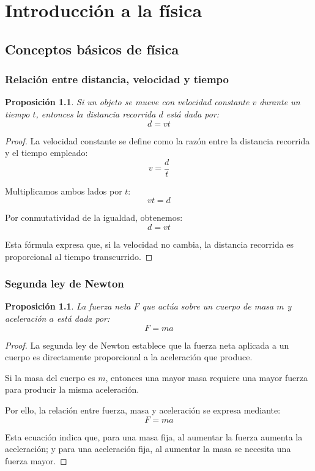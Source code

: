 \documentclass[12pt,final]{report}
\theoremstyle{plain}
\newtheorem{proposition}[theorem]{Proposición}
\theoremstyle{definition}
\begin{document}
\newpage

\chapter{Introducción a la física}

\section{Conceptos básicos de física}

\subsection{Relación entre distancia, velocidad y tiempo}

\begin{proposition}
Si un objeto se mueve con velocidad constante $v$ durante un tiempo $t$, entonces la distancia recorrida $d$ está dada por:
\[
d = vt
\]
\end{proposition}

\begin{proof}

La velocidad constante se define como la razón entre la distancia recorrida y el tiempo empleado:
\[
v = \frac{d}{t}
\]

Multiplicamos ambos lados por $t$:
\[
vt = d
\]

Por conmutatividad de la igualdad, obtenemos:
\[
d = vt
\]

Esta fórmula expresa que, si la velocidad no cambia, la distancia recorrida es proporcional al tiempo transcurrido.

\end{proof}

\newpage

\subsection{Segunda ley de Newton}

\begin{proposition}
La fuerza neta $F$ que actúa sobre un cuerpo de masa $m$ y aceleración $a$ está dada por:
\[
F = ma
\]
\end{proposition}

\begin{proof}

La segunda ley de Newton establece que la fuerza neta aplicada a un cuerpo es directamente proporcional a la aceleración que produce.

Si la masa del cuerpo es $m$, entonces una mayor masa requiere una mayor fuerza para producir la misma aceleración.

Por ello, la relación entre fuerza, masa y aceleración se expresa mediante:
\[
F = ma
\]

Esta ecuación indica que, para una masa fija, al aumentar la fuerza aumenta la aceleración; y para una aceleración fija, al aumentar la masa se necesita una fuerza mayor.

\end{proof}
\end{document}
